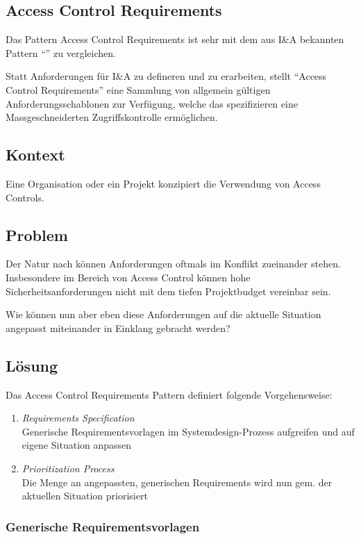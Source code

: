 \subsection{Access Control Requirements}

Das Pattern Access Control Requirements ist sehr mit dem aus I\&A bekannten Pattern ``'' zu vergleichen.

Statt Anforderungen für I\&A zu defineren und zu erarbeiten, stellt ``Access Control Requirements'' eine Sammlung von allgemein gültigen Anforderungsschablonen zur Verfügung, welche das spezifizieren eine Massgeschneiderten Zugriffskontrolle ermöglichen.


\subsection*{Kontext}
Eine Organisation oder ein Projekt konzipiert die Verwendung von Access Controls.

\subsection*{Problem}
Der Natur nach können Anforderungen oftmals im Konflikt zueinander stehen. Insbesondere im Bereich von Access Control können hohe Sicherheitsanforderungen nicht mit dem tiefen Projektbudget vereinbar sein.

Wie können nun aber eben diese Anforderungen auf die aktuelle Situation angepasst miteinander in Einklang gebracht werden?

\subsection*{Lösung}
Das Access Control Requirements Pattern definiert folgende Vorgehensweise:

\begin{enumerate}
	\item \emph{Requirements Specification}\\
	Generische Requirementsvorlagen im Systemdesign-Prozess aufgreifen und auf eigene Situation anpassen
	\item \emph{Prioritization Process}\\
	Die Menge an angepassten, generischen Requirements wird nun gem. der aktuellen Situation priorisiert
\end{enumerate}

\subsubsection*{Generische Requirementsvorlagen}

